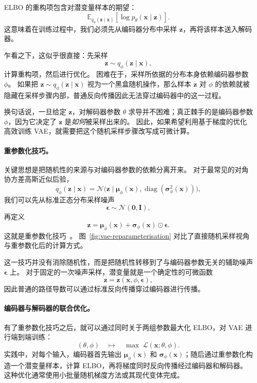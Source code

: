 ELBO 的重构项包含对潜变量样本的期望：
\[
\mathbb{E}_{q_{\phi}(\mathbf{z}\mid\mathbf{x})}
\!\left[
\log p_{\theta}(\mathbf{x}\mid\mathbf{z})
\right].
\]
这意味着在训练过程中，我们必须先从编码器分布中采样 $\mathbf{z}$，再将该样本送入解码器。

乍看之下，这似乎很直接：先采样
\[
\mathbf{z}\sim q_{\phi}(\mathbf{z}\mid\mathbf{x}),
\]
计算重构项，然后进行优化。
困难在于，采样所依据的分布本身依赖编码器参数 $\phi$。
如果把 $\mathbf{z}\sim q_{\phi}(\mathbf{z}\mid\mathbf{x})$
视为一个黑盒随机操作，那么样本 $\mathbf{z}$ 对 $\phi$ 的依赖就被隐藏在采样步骤内部，普通反向传播因此无法穿过编码器中的这一过程。

换句话说，一旦给定 $\mathbf{z}$，对解码器参数 $\theta$ 求导并不困难；真正棘手的是编码器参数 $\phi$，因为它决定了 $\mathbf{z}$ 是\emph{如何}被采样出来的。
因此，如果希望利用基于梯度的优化高效训练 VAE，就需要把这个随机采样步骤改写成可微计算。

\paragraph{重参数化技巧。}
关键思想是把随机性的来源与对编码器参数的依赖分离开来。
对于最常见的对角协方差高斯近似后验，
\[
q_{\phi}(\mathbf{z}\mid\mathbf{x})
=
\mathcal{N}\!\bigl(
\mathbf{z}\mid
\boldsymbol{\mu}_{\phi}(\mathbf{x}),
\operatorname{diag}(\boldsymbol{\sigma}_{\phi}^2(\mathbf{x}))
\bigr),
\]
我们可以先从标准正态分布采样噪声
\[
\boldsymbol{\epsilon}\sim\mathcal{N}(\mathbf{0},\mathbf{I}),
\]
再定义
\[
\mathbf{z}
=
\boldsymbol{\mu}_{\phi}(\mathbf{x})
+
\boldsymbol{\sigma}_{\phi}(\mathbf{x})\odot \boldsymbol{\epsilon}.
\]
这就是重参数化技巧~\cite{kingma2014autoencoding,rezende2014stochastic}。
图~\ref{fig:vae-reparameterisation} 对比了直接随机采样视角与重参数化后的计算方式。



这一技巧并没有消除随机性，而是把随机性转移到了与编码器参数无关的辅助噪声 $\boldsymbol{\epsilon}$ 上。
对于固定的一次噪声采样，潜变量就是一个确定性的可微函数
\[
\mathbf{z}=\mathbf{z}(\mathbf{x},\phi,\boldsymbol{\epsilon}),
\]
因此普通的路径导数可以通过标准反向传播穿过编码器进行传播。

\paragraph{编码器与解码器的联合优化。}
有了重参数化技巧之后，就可以通过同时关于两组参数最大化 ELBO，对 VAE 进行端到端训练：
\[
(\theta,\phi)
\quad\longmapsto\quad
\max \; \mathcal{L}(\mathbf{x};\theta,\phi).
\]
实践中，对每个输入，编码器首先输出
$\boldsymbol{\mu}_{\phi}(\mathbf{x})$ 和
$\boldsymbol{\sigma}_{\phi}(\mathbf{x})$；随后通过重参数化构造一个潜变量样本，计算 ELBO，再将梯度同时反向传播经过编码器和解码器。
这种优化通常使用小批量随机梯度方法或其现代变体完成。

